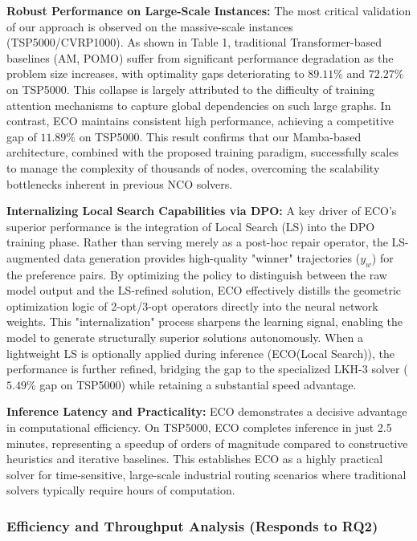 \documentclass{article}
\theoremstyle{plain}
\theoremstyle{definition}
\theoremstyle{remark}
\begin{document}
\textbf{Robust Performance on Large-Scale Instances:} The most critical validation of our approach is observed on the massive-scale instances (TSP5000/CVRP1000). As shown in Table 1, traditional Transformer-based baselines (AM, POMO) suffer from significant performance degradation as the problem size increases, with optimality gaps deteriorating to $89.11\%$ and $72.27\%$ on TSP5000. This collapse is largely attributed to the difficulty of training attention mechanisms to capture global dependencies on such large graphs. In contrast, ECO maintains consistent high performance, achieving a competitive gap of $11.89\%$ on TSP5000. This result confirms that our Mamba-based architecture, combined with the proposed training paradigm, successfully scales to manage the complexity of thousands of nodes, overcoming the scalability bottlenecks inherent in previous NCO solvers.

\textbf{Internalizing Local Search Capabilities via DPO:} A key driver of ECO's superior performance is the integration of Local Search (LS) into the DPO training phase. Rather than serving merely as a post-hoc repair operator, the LS-augmented data generation provides high-quality "winner" trajectories ($y_w$) for the preference pairs. By optimizing the policy to distinguish between the raw model output and the LS-refined solution, ECO effectively distills the geometric optimization logic of 2-opt/3-opt operators directly into the neural network weights. This "internalization" process sharpens the learning signal, enabling the model to generate structurally superior solutions autonomously. When a lightweight LS is optionally applied during inference (ECO(Local Search)), the performance is further refined, bridging the gap to the specialized LKH-3 solver ($5.49\%$ gap on TSP5000) while retaining a substantial speed advantage.

\textbf{Inference Latency and Practicality:} ECO demonstrates a decisive advantage in computational efficiency. On TSP5000, ECO completes inference in just 2.5 minutes, representing a speedup of orders of magnitude compared to constructive heuristics and iterative baselines. This establishes ECO as a highly practical solver for time-sensitive, large-scale industrial routing scenarios where traditional solvers typically require hours of computation.
\vspace{-5pt}
\subsubsection{Efficiency and Throughput Analysis (Responds to RQ2)}
\label{sec:4.2.2}
\vspace{-5pt}
\end{document}
